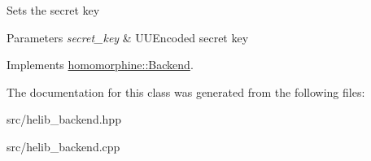 Sets the secret key


\begin{DoxyParams}{Parameters}
{\em secret\+\_\+key} & U\+U\+Encoded secret key \\
\hline
\end{DoxyParams}


Implements \mbox{\hyperlink{classhomomorphine_1_1_backend_af20abcf14fae6a93c02e6470ea111123}{homomorphine\+::\+Backend}}.



The documentation for this class was generated from the following files\+:\begin{DoxyCompactItemize}
\item 
src/helib\+\_\+backend.\+hpp\item 
src/helib\+\_\+backend.\+cpp\end{DoxyCompactItemize}
